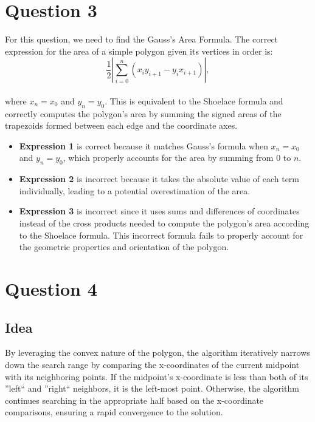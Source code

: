 \documentclass{article}
\begin{document}
\section*{Question 3}
For this question, we need to find the Gauss's Area Formula. The correct expression for the area of a simple polygon given its vertices in order is:
\\
\[ \frac{1}{2} \left| \sum_{i=0}^{n} (x_i y_{i+1} - y_i x_{i+1}) \right|, \]
\\
where \( x_n = x_0 \) and \( y_n = y_0 \). This is equivalent to the Shoelace formula and correctly computes the polygon's area by summing the signed areas of the trapezoids formed between each edge and the coordinate axes.
\\
\begin{itemize}
  \item \textbf{Expression 1} is correct because it matches Gauss's formula when \( x_n = x_0 \) and \( y_n = y_0 \), which properly accounts for the area by summing from 0 to \( n \).
  \item \textbf{Expression 2} is incorrect because it takes the absolute value of each term individually, leading to a potential overestimation of the area.
  \item \textbf{Expression 3} is incorrect since it uses sums and differences of coordinates instead of the cross products needed to compute the polygon's area according to the Shoelace formula. 
  This incorrect formula fails to properly account for the geometric properties and orientation of the polygon.
\end{itemize}

\section*{Question 4}

\subsection*{Idea}
By leveraging the convex nature of the polygon, the algorithm iteratively narrows down the search range by comparing the x-coordinates of the current midpoint with its neighboring points. If the midpoint's x-coordinate is less than both of its ''left`` and ''right`` neighbors, it is the left-most point. Otherwise, the algorithm continues searching in the appropriate half based on the x-coordinate comparisons, ensuring a rapid convergence to the solution.
\end{document}

